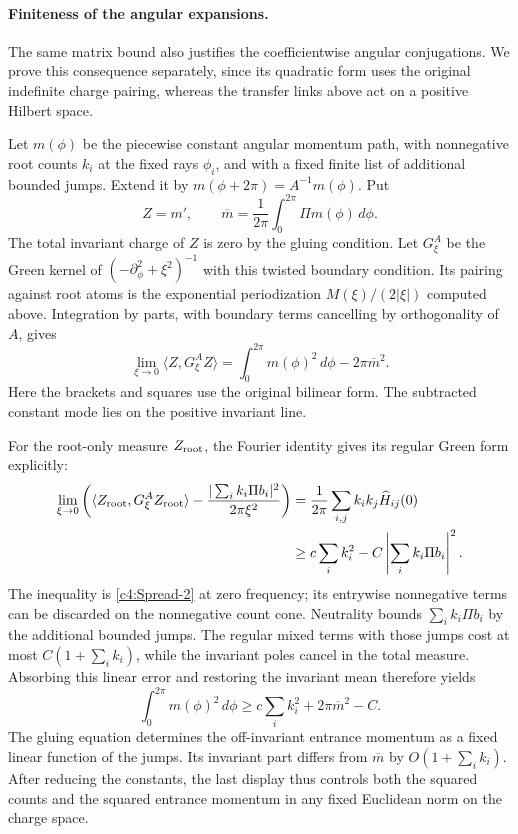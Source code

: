 \paragraph{Finiteness of the angular expansions.}
The same matrix bound also justifies the coefficientwise angular
conjugations. We prove this consequence separately, since its quadratic
form uses the original indefinite charge pairing, whereas the transfer
links above act on a positive Hilbert space.

Let \(m(\phi)\) be the piecewise constant angular momentum path, with
nonnegative root counts \(k_i\) at the fixed rays \(\phi_i\), and with a
fixed finite list of additional bounded jumps. Extend it by
\(m(\phi+2\pi)=A^{-1}m(\phi)\). Put
\[
 Z=m',\qquad
 \overline m=\frac1{2\pi}\int_0^{2\pi}\Pi m(\phi)\,d\phi.
\]
The total invariant charge of \(Z\) is zero by the gluing condition.
Let \(G_\xi^A\) be the Green kernel of
\((-\partial_\phi^2+\xi^2)^{-1}\) with this twisted boundary condition.
Its pairing against root atoms is the exponential periodization
\(M(\xi)/(2|\xi|)\) computed above. Integration by parts, with boundary
terms cancelling by orthogonality of \(A\), gives
\[
 \lim_{\xi\to0}\langle Z,G_\xi^A Z\rangle
   =\int_0^{2\pi}m(\phi)^2\,d\phi-2\pi\overline m^2.
\]
Here the brackets and squares use the original bilinear form. The
subtracted constant mode lies on the positive invariant line.

For the root-only measure \(Z_{\rm root}\), the Fourier identity gives
its regular Green form explicitly:
\[
 \begin{split}
 \lim_{\xi\to0}\left(
   \langle Z_{\rm root},G_\xi^A Z_{\rm root}\rangle
   -\frac{|\sum_i k_i\Pi b_i|^2}{2\pi\xi^2}\right)
 &=\frac1{2\pi}\sum_{i,j}k_i k_j\widehat H_{ij}(0)\\
 &\ge c\sum_i k_i^2-C\left|\sum_i k_i\Pi b_i\right|^2.
 \end{split}
\]
The inequality is \eqref{c4:Spread-2} at zero frequency; its
entrywise nonnegative terms can be discarded on the nonnegative count
cone. Neutrality bounds \(\sum_i k_i\Pi b_i\) by the additional bounded
jumps. The regular mixed terms with those jumps cost at most
\(C(1+\sum_i k_i)\), while the invariant poles cancel in the total
measure. Absorbing this linear error and restoring the invariant mean
therefore yields
\[
 \int_0^{2\pi}m(\phi)^2\,d\phi
       \ge c\sum_i k_i^2+2\pi\overline m^2-C.
\]
The gluing equation determines the off-invariant entrance momentum as a
fixed linear function of the jumps. Its invariant part differs from
\(\overline m\) by \(O(1+\sum_i k_i)\). After reducing the constants, the
last display thus controls both the squared counts and the squared
entrance momentum in any fixed Euclidean norm on the charge space.


